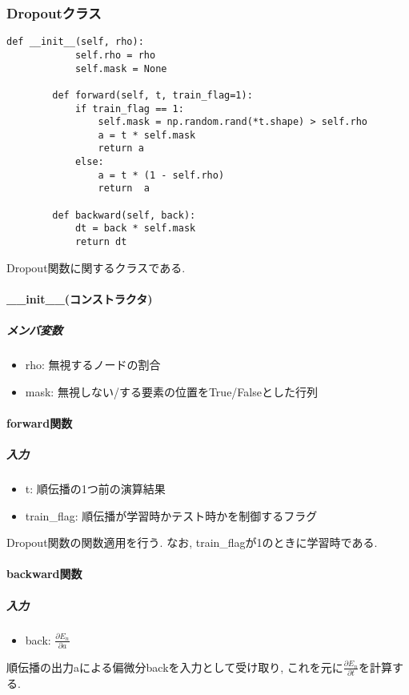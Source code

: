 \documentclass[a4j, titlepage]{jarticle}
\begin{document}
    \subsubsection{Dropoutクラス}
        \begin{lstlisting}[caption=Dropout関数の計算 ,label=fuga]
        def __init__(self, rho):
            self.rho = rho
            self.mask = None

        def forward(self, t, train_flag=1):
            if train_flag == 1:
                self.mask = np.random.rand(*t.shape) > self.rho
                a = t * self.mask
                return a
            else:
                a = t * (1 - self.rho)
                return  a

        def backward(self, back):
            dt = back * self.mask
            return dt
        \end{lstlisting}
        Dropout関数に関するクラスである.
        \paragraph*{\_\_init\_\_(コンストラクタ)}
            \subparagraph*{メンバ変数}
            \begin{itemize}
                \item rho: 無視するノードの割合
                \item mask: 無視しない/する要素の位置をTrue/Falseとした行列
            \end{itemize}
        \paragraph*{forward関数}
            \subparagraph*{入力}
            \begin{itemize}
                \item t: 順伝播の1つ前の演算結果
                \item train\_flag: 順伝播が学習時かテスト時かを制御するフラグ
            \end{itemize}
            Dropout関数の関数適用を行う.
            なお, train\_flagが1のときに学習時である.
        \paragraph*{backward関数}
            \subparagraph*{入力}
            \begin{itemize}
                \item back: \(\displaystyle \frac{\partial E_n}{\partial a}\)
            \end{itemize}
            順伝播の出力aによる偏微分backを入力として受け取り, これを元に\(\displaystyle \frac{\partial E_n}{\partial t}\)を計算する.
\end{document}

